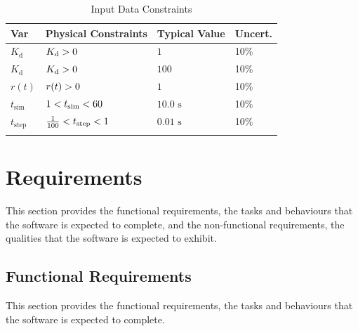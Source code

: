 \documentclass[12pt]{article}
\newcommand{\gt}{\ensuremath >}
\newcommand{\lt}{\ensuremath <}
\begin{document}
\begin{longtable}{l l l l}
\toprule
\textbf{Var} & \textbf{Physical Constraints} & \textbf{Typical Value} & \textbf{Uncert.}
\\
\midrule
\endhead
${K_{\text{d}}}$ & ${K_{\text{d}}}\gt{}0$ & $1$ & 10$\%$
\\
${K_{\text{d}}}$ & ${K_{\text{d}}}\gt{}0$ & $100$ & 10$\%$
\\
$r(t)$ & $r(t)\gt{}0$ & $1$ & 10$\%$
\\
${t_{\text{sim}}}$ & $1\lt{}{t_{\text{sim}}}\lt{}60$ & $10.0$ ${\text{s}}$ & 10$\%$
\\
${t_{\text{step}}}$ & $\frac{1}{100}\lt{}{t_{\text{step}}}\lt{}1$ & $0.01$ ${\text{s}}$ & 10$\%$
\\
\bottomrule
\caption{Input Data Constraints}
\label{Table:InDataConstraints}
\end{longtable}
\section{Requirements}
\label{Sec:Requirements}
This section provides the functional requirements, the tasks and behaviours that the software is expected to complete, and the non-functional requirements, the qualities that the software is expected to exhibit.

\subsection{Functional Requirements}
\label{Sec:FRs}
This section provides the functional requirements, the tasks and behaviours that the software is expected to complete.
\end{document}
